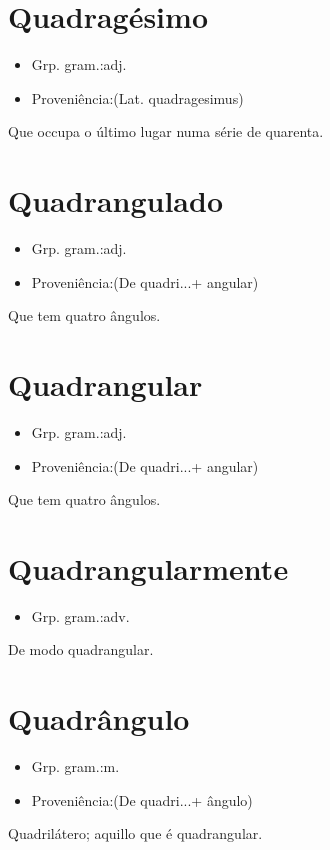 \section{Quadragésimo}
\begin{itemize}
\item {Grp. gram.:adj.}
\end{itemize}
\begin{itemize}
\item {Proveniência:(Lat. \textunderscore quadragesimus\textunderscore )}
\end{itemize}
Que occupa o último lugar numa série de quarenta.
\section{Quadrangulado}
\begin{itemize}
\item {Grp. gram.:adj.}
\end{itemize}
\begin{itemize}
\item {Proveniência:(De \textunderscore quadri...\textunderscore  + \textunderscore angular\textunderscore )}
\end{itemize}
Que tem quatro ângulos.
\section{Quadrangular}
\begin{itemize}
\item {Grp. gram.:adj.}
\end{itemize}
\begin{itemize}
\item {Proveniência:(De \textunderscore quadri...\textunderscore  + \textunderscore angular\textunderscore )}
\end{itemize}
Que tem quatro ângulos.
\section{Quadrangularmente}
\begin{itemize}
\item {Grp. gram.:adv.}
\end{itemize}
De modo quadrangular.
\section{Quadrângulo}
\begin{itemize}
\item {Grp. gram.:m.}
\end{itemize}
\begin{itemize}
\item {Proveniência:(De \textunderscore quadri...\textunderscore  + \textunderscore ângulo\textunderscore )}
\end{itemize}
Quadrilátero; aquillo que é quadrangular.
